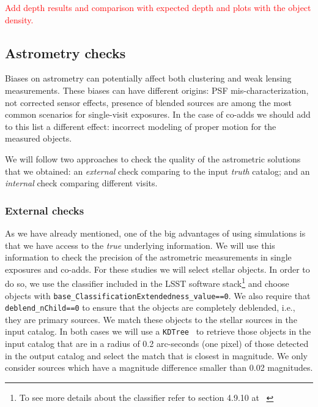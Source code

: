 \documentclass[\docopts]{\docclass}
\begin{document}
\textcolor{red}{Add depth results and comparison with expected depth and plots with the object density.}

\subsection{Astrometry checks}
\label{sec:astrometry_checks}

Biases on astrometry can potentially affect both clustering and weak lensing measurements. These biases
can have different origins: PSF mis-characterization, not corrected sensor effects, presence of blended sources are among
the most common scenarios for single-visit exposures. In the case of co-adds we should add to this list a different effect:
incorrect modeling of proper motion for the measured objects.

We will follow two approaches to check the quality of the astrometric solutions that we obtained: an \textit{external} check
comparing to the input \textit{truth} catalog; and an \textit{internal} check comparing different visits.

\subsubsection{External checks}
\label{sec:external_astrometry}

As we have already mentioned, one of the big advantages of using simulations is that we have access to the \textit{true}
underlying information. We will use this information to check the precision of the astrometric measurements in single exposures
and co-adds. For these studies we will select stellar objects. In order to do so, we use the classifier
included in the LSST software stack\footnote{To see more details about the classifier refer to section 4.9.10 at
~\citep{2017arXiv170506766B}} and choose objects with \texttt{base\_ClassificationExtendedness\_value==0}.
We also require that \texttt{deblend\_nChild==0} to ensure that the objects are completely deblended, i.e., they are primary
sources. We match these objects to the stellar sources in the input catalog. In both cases we will use a
\texttt{KDTree}~\citep{scikit-learn} to retrieve those objects in the input catalog that are in a radius of 0.2 arc-seconds
(one pixel) of those detected in the output catalog and select the match that is closest in magnitude. We only consider sources
which have a magnitude difference smaller than 0.02 magnitudes.
\end{document}
